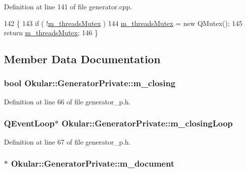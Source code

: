 Definition at line 141 of file generator.\+cpp.


\begin{DoxyCode}
142 \{
143     \textcolor{keywordflow}{if} ( !\hyperlink{classOkular_1_1GeneratorPrivate_ae7b9db42a3b44647ae1e6e4d44a57d63}{m\_threadsMutex} )
144         \hyperlink{classOkular_1_1GeneratorPrivate_ae7b9db42a3b44647ae1e6e4d44a57d63}{m\_threadsMutex} = \textcolor{keyword}{new} QMutex();
145     \textcolor{keywordflow}{return} \hyperlink{classOkular_1_1GeneratorPrivate_ae7b9db42a3b44647ae1e6e4d44a57d63}{m\_threadsMutex};
146 \}
\end{DoxyCode}


\subsection{Member Data Documentation}
\hypertarget{classOkular_1_1GeneratorPrivate_a7d341f5f522cadfa690f0ec17e4cfe12}{
\subsubsection[{m\+\_\+closing}]{\setlength{\rightskip}{0pt plus 5cm}bool Okular\+::\+Generator\+Private\+::m\+\_\+closing}}\label{classOkular_1_1GeneratorPrivate_a7d341f5f522cadfa690f0ec17e4cfe12}


Definition at line 66 of file generator\+\_\+p.\+h.

\hypertarget{classOkular_1_1GeneratorPrivate_a149e0e50d6cd4f2301144db1b50b42be}{
\subsubsection[{m\+\_\+closing\+Loop}]{\setlength{\rightskip}{0pt plus 5cm}Q\+Event\+Loop$\ast$ Okular\+::\+Generator\+Private\+::m\+\_\+closing\+Loop}}\label{classOkular_1_1GeneratorPrivate_a149e0e50d6cd4f2301144db1b50b42be}


Definition at line 67 of file generator\+\_\+p.\+h.

\hypertarget{classOkular_1_1GeneratorPrivate_aaff9e2470745eed4bde94aa19be9b891}{
\subsubsection[{m\+\_\+document}]{$\ast$ Okular\+::\+Generator\+Private\+::m\+\_\+document}}\label{classOkular_1_1GeneratorPrivate_aaff9e2470745eed4bde94aa19be9b891}


